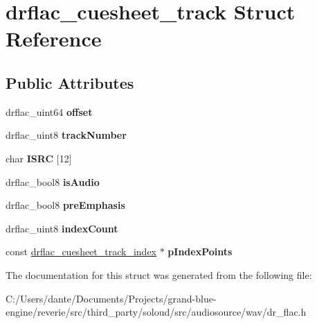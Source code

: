 \hypertarget{structdrflac__cuesheet__track}{}\section{drflac\+\_\+cuesheet\+\_\+track Struct Reference}
\label{structdrflac__cuesheet__track}
\subsection*{Public Attributes}
\begin{DoxyCompactItemize}
\item 
\mbox{\label{structdrflac__cuesheet__track_af4acb04ad8a738158e30b4ed04aa2d52}} 
drflac\+\_\+uint64 {\bfseries offset}
\item 
\mbox{\label{structdrflac__cuesheet__track_a13814c554ba1fdfd4ee0a36b1a67ac79}} 
drflac\+\_\+uint8 {\bfseries track\+Number}
\item 
\mbox{\label{structdrflac__cuesheet__track_a88cdb641ef9c8eb980a9015b5109b92c}} 
char {\bfseries I\+S\+RC} \mbox{[}12\mbox{]}
\item 
\mbox{\label{structdrflac__cuesheet__track_a147088afc66faae21032d7d66864d64b}} 
drflac\+\_\+bool8 {\bfseries is\+Audio}
\item 
\mbox{\label{structdrflac__cuesheet__track_a3ca412c42208b2311031773d4159d50d}} 
drflac\+\_\+bool8 {\bfseries pre\+Emphasis}
\item 
\mbox{\label{structdrflac__cuesheet__track_a28b2380499b6e79255c1084d4ba7a3b0}} 
drflac\+\_\+uint8 {\bfseries index\+Count}
\item 
\mbox{\label{structdrflac__cuesheet__track_ad721b5c18e1c6e0c1988cd49a9f3ece5}} 
const \mbox{\hyperlink{structdrflac__cuesheet__track__index}{drflac\+\_\+cuesheet\+\_\+track\+\_\+index}} $\ast$ {\bfseries p\+Index\+Points}
\end{DoxyCompactItemize}


The documentation for this struct was generated from the following file\+:\begin{DoxyCompactItemize}
\item 
C\+:/\+Users/dante/\+Documents/\+Projects/grand-\/blue-\/engine/reverie/src/third\+\_\+party/soloud/src/audiosource/wav/dr\+\_\+flac.\+h\end{DoxyCompactItemize}
